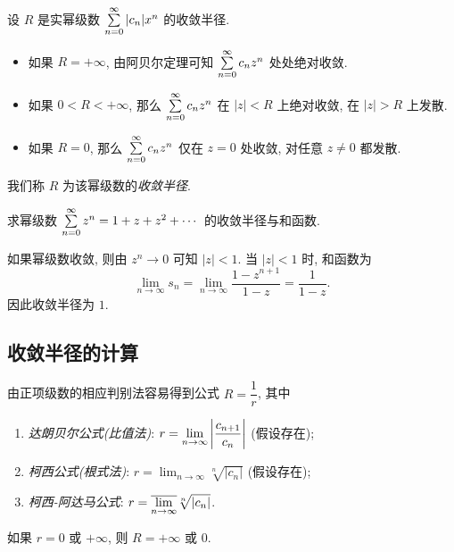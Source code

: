 \documentclass[nocolor,theme=doremi,lang=cn,11pt,chinese,twoside,openright,usesamecnt]{elegantbook}
\begin{document}
设 $R$ 是实幂级数 $\sum\limits_{n=0}^\infty|c_n|x^n$ 的收敛半径.
\begin{itemize}
	\item 如果 $R=+\infty$, 由阿贝尔定理可知 $\sum\limits_{n=0}^\infty c_nz^n$ 处处绝对收敛.
	\item 如果 $0<R<+\infty$, 那么 $\sum\limits_{n=0}^\infty c_nz^n$ 在 $|z|<R$ 上绝对收敛, 在 $|z|>R$ 上发散.
	\item 如果 $R=0$, 那么 $\sum\limits_{n=0}^\infty c_nz^n$ 仅在 $z=0$ 处收敛, 对任意 $z\neq 0$ 都发散.
\end{itemize}
我们称 $R$ 为该幂级数的\emph{收敛半径}.

\begin{center}
\end{center}

\begin{example}
	求幂级数 $\sum\limits_{n=0}^\infty z^n=1+z+z^2+\cdots$ 的收敛半径与和函数.
\end{example}

\begin{solution}
	如果幂级数收敛, 则由 $z^n\to0$ 可知 $|z|<1$.
	{当 $|z|<1$ 时, 和函数为
		\[\lim_{n\to\infty}s_n=\lim_{n\to\infty}\frac{1-z^{n+1}}{1-z}=\frac1{1-z}.\]因此收敛半径为 $1$.}
\end{solution}

\subsection{收敛半径的计算}

由正项级数的相应判别法容易得到公式 $R=\dfrac1r$, 其中
\begin{enumerate}
	\item \emph{达朗贝尔公式(比值法)}: $r=\displaystyle\lim_{n\to\infty}\left|\frac{c_{n+1}}{c_n}\right|$ (假设存在);
	\item \emph{柯西公式(根式法)}: $r=\displaystyle\lim_{n\to\infty}\sqrt[n]{|c_n|}$ (假设存在);
	\item \emph{柯西-阿达马公式}: $r=\displaystyle\overline{\lim_{n\to\infty}} \sqrt[n]{|c_n|}$.
\end{enumerate}
如果 $r=0$ 或 $+\infty$, 则 $R=+\infty$ 或 $0$.
\end{document}
